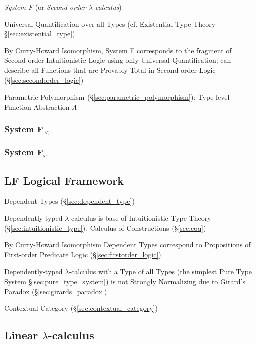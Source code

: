 \emph{System F} (or \emph{Second-order $\lambda$-calculus})

Universal Quantification over all Types (cf. Existential Type Theory
\S\ref{sec:existential_type})

By Curry-Howard Isomorphism, System F corresponds to the fragment of
Second-order Intuitionistic Logic using only Universal Quantification;
can describe all Functions that are Provably Total in Second-order
Logic (\S\ref{sec:secondorder_logic})

Parametric Polymorphism (\S\ref{sec:parametric_polymorphism}):
Type-level Function Abstraction $\Lambda$



\subsubsection{System F$_{<:}$}\label{sec:system_fsub}

\subsubsection{System F$_\omega$}\label{sec:system_fomega}



\subsection{LF Logical Framework}
\label{sec:logical_framework}

Dependent Types (\S\ref{sec:dependent_type})

Dependently-typed $\lambda$-calculus is base of Intuitionistic Type
Theory (\S\ref{sec:intuitionistic_type}), Calculus of Constructions
(\S\ref{sec:coq})

By Curry-Howard Isomorphism Dependent Types correspond to Propositions
of First-order Predicate Logic (\S\ref{sec:firstorder_logic})

Dependently-typed $\lambda$-calculus with a Type of all Types (the
simplest Pure Type System \S\ref{sec:pure_type_system}) is not
Strongly Normalizing due to Girard's Paradox
(\S\ref{sec:girards_paradox})

Contextual Category (\S\ref{sec:contextual_category})



\subsection{Linear $\lambda$-calculus}\label{sec:linear_lambda}

